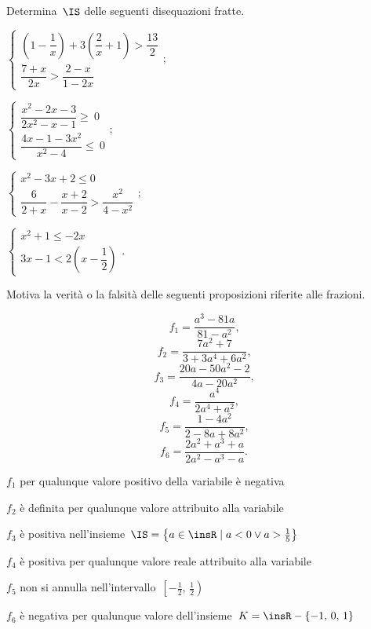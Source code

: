 \begin{esercizio}[\Ast]
\label{ese:20.68}
Determina~$\IS$ delle seguenti disequazioni fratte.
\begin{multicols}{2}
\begin{enumeratea}{\longarray
 \item $\left\{\begin{array}{l}
		\left(1-\dfrac{1}{x}\right)+3\left(\dfrac{2}{x}+1\right)>\dfrac{13}{2}\\
		\dfrac{7+x}{2x}>\dfrac{2-x}{1-2x}
   \end{array}\right.;$
\item $\left\{\begin{array}{l}
		\dfrac{x^{2}-2x-3}{2x^{2}-x-1}\ge~0\\
		\dfrac{4x-1-3x^{2}}{x^{2}-4}\le~0
	\end{array}\right.;$
\item $\left\{\begin{array}{l}
		x^{2}-3x+2\le0\\
		\dfrac{6}{2+x}-\dfrac{x+2}{x-2}>\dfrac{x^{2}}{4-x^{2}}
	\end{array}\right.;$
\item $\left\{\begin{array}{l}
		x^{2}+1\le -2x\\
		3x-1<2\left(x-\dfrac{1}{2}\right)
		\end{array}\right..$}
\end{enumeratea}
\end{multicols}
\end{esercizio}

\begin{esercizio}
\label{ese:20.69}
Motiva la verità o la falsità delle seguenti
proposizioni riferite alle frazioni.
\begin{multicols}{3}
\noindent\[f_{1}=\frac{a^{3}-81a}{81-a^{2}}\text{,}\]
\[f_{2}=\frac{7a^{2}+7}{3+3a^{4}+6a^{2}}\text{,}\]
\[f_{3}=\frac{20a-50a^{2}-2}{4a-20a^{2}}\text{,}\]
\[f_{4}=\frac{a^{4}}{2a^{4}+a^{2}}\text{,}\]
\[f_{5}=\frac{1-4a^{2}}{2-8a+8a^{2}}\text{,}\]
\[f_{6}=\frac{2a^{2}+a^{3}+a}{2a^{2}-a^{3}-a}.\]
\end{multicols}
\begin{enumeratea}
\TabPositions{11cm}
\item $f_{1}$ per qualunque valore positivo della variabile è negativa \tab\boxV\quad\boxF
\item $f_{2}$ è definita per qualunque valore attribuito alla variabile \tab\boxV\quad\boxF
\item $f_{3}$ è positiva nell'insieme~$\IS=\left\{a\in \insR\;|\;a<0\vee a>\frac{1}{5}\right\}$ \tab\boxV\quad\boxF
\item $f_{4}$ è positiva per qualunque valore reale attribuito alla variabile \tab\boxV\quad\boxF
\item $f_{5}$ non si annulla nell'intervallo~$\left[-\frac{1}{2}\text{,~}\frac{1}{2}\right)$ \tab\boxV\quad\boxF
\item $f_{6}$ è negativa per qualunque valore dell'insieme~$K=\insR-\{-1\text{,~}0\text{,~}1\}$ \tab\boxV\quad\boxF
\end{enumeratea}
\end{esercizio}

